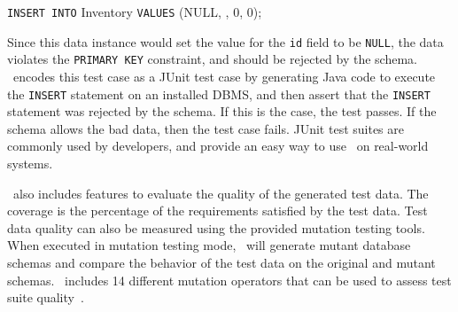 
\vspace*{.1in}
\texttt{INSERT INTO} Inventory \texttt{VALUES} (NULL, \textquotesingle\textquotesingle, 0, 0);
\vspace*{.1in}

Since this data instance would set the value for the \texttt{id} field to be \texttt{NULL}, the data violates the
\texttt{PRIMARY KEY} constraint, and should be rejected by the schema.  \sa~encodes this test case as a JUnit test case
by generating Java code to execute the \texttt{INSERT} statement on an installed DBMS, and then assert that the
\texttt{INSERT} statement was rejected by the schema. If this is the case, the test passes.  If the schema allows the
bad data, then the test case fails. JUnit test suites are commonly used by developers, and provide an easy way to use
\sa~on real-world systems.

\sa~also includes features to evaluate the quality of the generated test data. The coverage is the percentage of the
requirements satisfied by the test data.  Test data quality can also be measured using the provided mutation testing
tools. When executed in mutation testing mode, \sa~will generate mutant database schemas and compare the behavior of the
test data on the original and mutant schemas. \sa~includes 14 different mutation operators that can be used to assess
test suite quality~\cite{wright2015mutation}.


